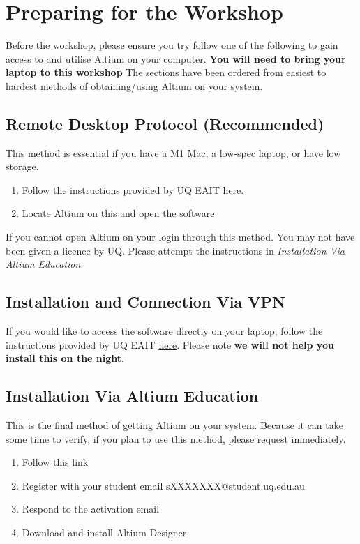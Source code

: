 \documentclass[a4paper,12pt]{report}
\begin{document}
\restoregeometry

\section*{Preparing for the Workshop}

Before the workshop, please ensure you try follow one of the following to gain access to and utilise Altium on your computer. 
\textbf{You will need to bring your laptop to this workshop}
The sections have been ordered from easiest to hardest methods of obtaining/using Altium on your system.

\subsection*{Remote Desktop Protocol (Recommended)}

This method is essential if you have a M1 Mac, a low-spec laptop, or have low storage.

\begin{enumerate}
    \item Follow the instructions provided by UQ EAIT \href{https://student.eait.uq.edu.au/infrastructure/remote-access/rdp.html}{here}.
    \item Locate Altium on this and open the software
\end{enumerate}

If you cannot open Altium on your login through this method. You may not have been given a licence by UQ. Please attempt the instructions in \textit{Installation Via Altium Education}.


\subsection*{Installation and Connection Via VPN}

If you would like to access the software directly on your laptop, follow the instructions provided by UQ EAIT \href{https://student.eait.uq.edu.au/software/altium/}{here}. Please note \textbf{we will not help you install this on the night}.


\subsection*{Installation Via Altium Education}

This is the final method of getting Altium on your system. Because it can take some time to verify, if you plan to use this method, please request immediately.

\begin{enumerate}
    \item Follow \href{https://www.altium.com/education/student-licenses}{this link}
    \item Register with your student email sXXXXXXX@student.uq.edu.au
    \item Respond to the activation email
    \item Download and install Altium Designer
\end{enumerate}
\end{document}
